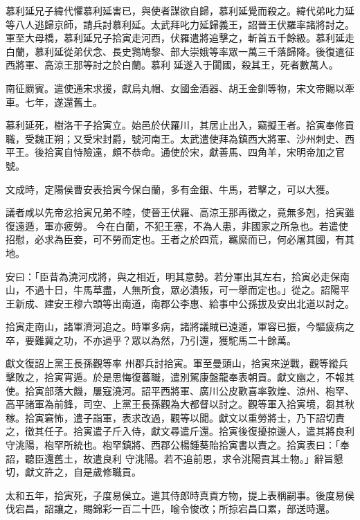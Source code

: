 \begin{pinyinscope}
 慕利延兄子緯代懼慕利延害已，與使者謀欲自歸，慕利延覺而殺之。緯代弟叱力延等八人逃歸京師，請兵討慕利延。太武拜叱力延歸義王，詔晉王伏羅率諸將討之。軍至大母橋，慕利延兄子拾寅走河西，伏羅遣將追擊之，斬首五千餘級。慕利延走白蘭，慕利延從弟伏念、長史䳕鳩黎、部大崇娥等率眾一萬三千落歸降。後復遣征西將軍、高涼王那等討之於白蘭。慕利
 延遂入于闐國，殺其王，死者數萬人。



 南征罽賓。遣使通宋求援，獻烏丸帽、女國金酒器、胡王金釧等物，宋文帝賜以牽車。七年，遂還舊土。



 慕利延死，樹洛干子拾寅立。始邑於伏羅川，其居止出入，竊擬王者。拾寅奉修貢職，受魏正朔；又受宋封爵，號河南王。太武遣使拜為鎮西大將軍、沙州刺史、西平王。後拾寅自恃險遠，頗不恭命。通使於宋，獻善馬、四角羊，宋明帝加之官號。



 文成時，定陽侯曹安表拾寅今保白蘭，多有金銀、牛馬，若擊之，可以大獲。



 議者咸以先帝忿拾寅兄弟不睦，使晉王伏羅、高涼王那再徵之，竟無多剋，拾寅雖復遠遁，軍亦疲勞。
 今在白蘭，不犯王塞，不為人患，非國家之所急也。若遣使招慰，必求為臣妾，可不勞而定也。王者之於四荒，羈縻而已，何必屠其國，有其地。



 安曰：「臣昔為澆河戍將，與之相近，明其意勢。若分軍出其左右，拾寅必走保南山，不過十日，牛馬草盡，人無所食，眾必潰叛，可一舉而定也。」從之。詔陽平王新成、建安王穆六頭等出南道，南郡公李惠、給事中公孫拔及安出北道以討之。



 拾寅走南山，諸軍濟河追之。時軍多病，諸將議賊已遠遁，軍容已振，今驅疲病之卒，要難冀之功，不亦過乎？眾以為然，乃引還，獲駝馬二十餘萬。



 獻文復詔上黨王長孫觀等率
 州郡兵討拾寅。軍至曼頭山，拾寅來逆戰，觀等縱兵擊敗之，拾寅宵遁。於是思悔復蕃職，遣別駕康盤龍奉表朝貢。獻文幽之，不報其使。拾寅部落大饑，屢寇澆河。詔平西將軍、廣川公皮歡喜率敦煌、涼州、枹罕、高平諸軍為前鋒，司空、上黨王長孫觀為大都督以討之。觀等軍入拾寅境，芻其秋稼。拾寅窘怖，遣子詣軍，表求改過，觀等以聞。獻文以重勞將士，乃下詔切責之，徵其任子。拾寅遣子斤入侍，獻文尋遣斤還。拾寅後復擾掠邊人，遣其將良利守洮陽，枹罕所統也。枹罕鎮將、西郡公楊鍾葵貽拾寅書以責之。拾寅表曰：「奉詔，聽臣還舊土，故遣良利
 守洮陽。若不追前恩，求令洮陽貢其土物。」辭旨懇切，獻文許之，自是歲修職貢。



 太和五年，拾寅死，子度易侯立。遣其侍郎時真貢方物，提上表稱嗣事。後度易侯伐宕昌，詔讓之，賜錦彩一百二十匹，喻令悛改；所掠宕昌口累，部送時還。




\end{pinyinscope}
